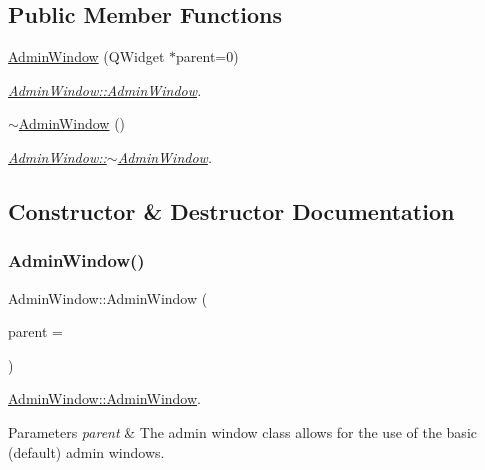 \subsection*{Public Member Functions}
\begin{DoxyCompactItemize}
\item 
\mbox{\hyperlink{class_admin_window_a9851707c3d87acec48db6db86ae04ca4}{Admin\+Window}} (Q\+Widget $\ast$parent=0)
\begin{DoxyCompactList}\small\item\em \mbox{\hyperlink{class_admin_window_a9851707c3d87acec48db6db86ae04ca4}{Admin\+Window\+::\+Admin\+Window}}. \end{DoxyCompactList}\item 
\mbox{\hyperlink{class_admin_window_ad31a734a759bfb65008b03e6bb9014d0}{$\sim$\+Admin\+Window}} ()
\begin{DoxyCompactList}\small\item\em \mbox{\hyperlink{class_admin_window_ad31a734a759bfb65008b03e6bb9014d0}{Admin\+Window\+::$\sim$\+Admin\+Window}}. \end{DoxyCompactList}\end{DoxyCompactItemize}


\subsection{Constructor \& Destructor Documentation}
\mbox{\label{class_admin_window_a9851707c3d87acec48db6db86ae04ca4}} 
\subsubsection{\texorpdfstring{Admin\+Window()}{AdminWindow()}}
{\footnotesize\ttfamily Admin\+Window\+::\+Admin\+Window (\begin{DoxyParamCaption}\item[{Q\+Widget $\ast$}]{parent = {} }\end{DoxyParamCaption})\hspace{0.3cm}{\ttfamily [explicit]}}



\mbox{\hyperlink{class_admin_window_a9851707c3d87acec48db6db86ae04ca4}{Admin\+Window\+::\+Admin\+Window}}. 


\begin{DoxyParams}{Parameters}
{\em parent} & The admin window class allows for the use of the basic (default) admin windows. \\
\hline
\end{DoxyParams}
\mbox{\label{class_admin_window_ad31a734a759bfb65008b03e6bb9014d0}} 
